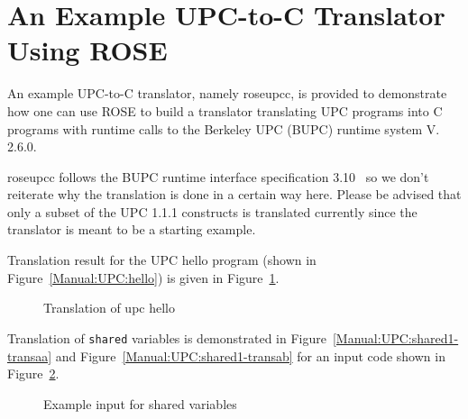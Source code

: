 \clearpage
\section{An Example UPC-to-C Translator Using ROSE}
An example UPC-to-C translator, namely roseupcc, is provided to 
demonstrate how one can use ROSE to build a translator translating UPC
programs into C programs with runtime calls to the Berkeley UPC (BUPC)
runtime system V. 2.6.0. 

roseupcc follows the BUPC runtime interface specification 3.10~\cite{BUPC3.10} so
we don't reiterate why the translation is done in a certain way here. 
Please be advised that only a subset of the UPC 1.1.1 constructs is
translated currently since the translator is meant to be a starting example.

Translation result for the UPC hello program (shown in
Figure~\ref{Manual:UPC:hello}) is given in Figure~\ref{Manual:UPC:hello-trans}. 
\begin{figure}[!h]
{\indent
  {\mySmallFontSize
    \begin{latexonly}
    
    \end{latexonly}
    \begin{htmlonly}
    
    \end{htmlonly}
  }
}
\caption{Translation of upc hello}
\label{Manual:UPC:hello-trans}
\end{figure}

\clearpage
Translation of \lstinline{shared} variables is demonstrated in
Figure~\ref{Manual:UPC:shared1-transaa} and
Figure~\ref{Manual:UPC:shared1-transab} for an input code shown in
Figure~\ref{Manual:UPC:shared1}.

\begin{figure}[!h]
{\indent
  {\mySmallFontSize
    \begin{latexonly}
    
    \end{latexonly}
    \begin{htmlonly}
    
    \end{htmlonly}
  }
}
\caption{Example input for shared variables}
\label{Manual:UPC:shared1}
\end{figure}


